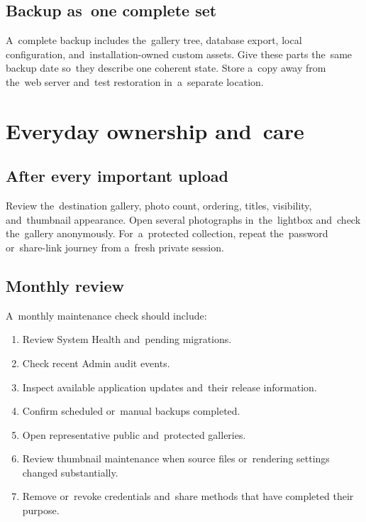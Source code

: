 \documentclass[11pt,a4paper]{article}
\begin{document}
\subsection{Backup as~one complete set}

A~complete backup includes the~gallery tree, database export, local
configuration, and~installation-owned custom assets. Give these parts the~same
backup date so~they describe one coherent state. Store a~copy away from the~web
server and~test restoration in~a~separate location.

\section{Everyday ownership and~care}
\label{sec:daily-care}

\subsection{After every important upload}

Review the~destination gallery, photo count, ordering, titles, visibility,
and~thumbnail appearance. Open several photographs in~the~lightbox and~check
the~gallery anonymously. For~a~protected collection, repeat the~password
or~share-link journey from a~fresh private session.

\subsection{Monthly review}

A~monthly maintenance check should include:

\begin{enumerate}
  \item Review System Health and~pending migrations.
  \item Check recent Admin audit events.
  \item Inspect available application updates and~their release information.
  \item Confirm scheduled or~manual backups completed.
  \item Open representative public and~protected galleries.
  \item Review thumbnail maintenance when source files or~rendering settings
  changed substantially.
  \item Remove or~revoke credentials and~share methods that have completed their
  purpose.
\end{enumerate}
\end{document}

